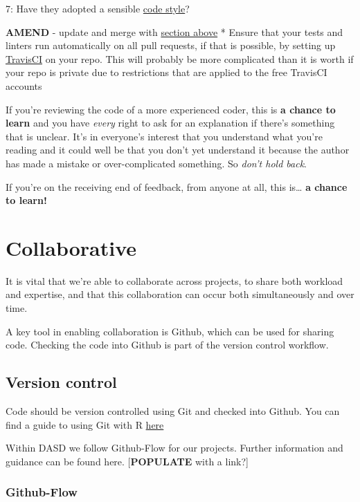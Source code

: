 \documentclass[]{book}
\begin{document}
7: Have they adopted a sensible \protect\hyperlink{style}{code style}?

\textbf{AMEND} - update and merge with \protect\hyperlink{defaults}{section above}
* Ensure that your tests and linters run automatically on all pull requests, if that is possible, by setting up \href{https://travis-ci.org/}{TravisCI} on your repo. This will probably be more complicated than it is worth if your repo is private due to restrictions that are applied to the free TravisCI accounts

If you're reviewing the code of a more experienced coder, this is \textbf{a chance to learn} and you have \emph{every} right to ask for an explanation if there's something that is unclear. It's in everyone's interest that you understand what you're reading and it could well be that you don't yet understand it because the author has made a mistake or over-complicated something. So \emph{don't hold back}.

If you're on the receiving end of feedback, from anyone at all, this is\ldots{} \textbf{a chance to learn!}

\hypertarget{collaborate}{%
\chapter{Collaborative}\label{collaborate}}

It is vital that we're able to collaborate across projects, to share both workload and expertise, and that this collaboration can occur both simultaneously and over time.

A key tool in enabling collaboration is Github, which can be used for sharing code. Checking the code into Github is part of the version control workflow.

\hypertarget{versioncontrol}{%
\section{Version control}\label{versioncontrol}}

Code should be version controlled using Git and checked into Github.
You can find a guide to using Git with R \href{http://happygitwithr.com/}{here}

Within DASD we follow Github-Flow for our projects. Further information and guidance can be found here. {[}\textbf{POPULATE} with a link?{]}

\hypertarget{flow}{%
\subsection*{Github-Flow}\label{flow}}
\end{document}
